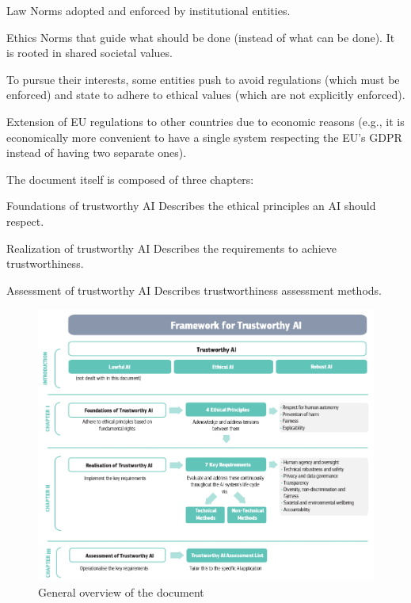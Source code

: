 \begin{remark}
    \phantom{}
    \begin{descriptionlist}
        \item[Law]  
            Norms adopted and enforced by institutional entities.
        
        \item[Ethics]  
            Norms that guide what should be done (instead of what can be done). It is rooted in shared societal values.
    \end{descriptionlist}

    \indenttbox
    \begin{example}
        To pursue their interests, some entities push to avoid regulations (which must be enforced) and state to adhere to ethical values (which are not explicitly enforced).
    \end{example}
    
    \indenttbox
    \begin{example}
        Extension of EU regulations to other countries due to economic reasons (e.g., it is economically more convenient to have a single system respecting the EU's GDPR instead of having two separate ones).
    \end{example}
\end{remark}

The document itself is composed of three chapters:
\begin{descriptionlist}
    \item[Foundations of trustworthy AI]
        Describes the ethical principles an AI should respect.

    \item[Realization of trustworthy AI] 
        Describes the requirements to achieve trustworthiness.

    \item[Assessment of trustworthy AI] 
        Describes trustworthiness assessment methods.
\end{descriptionlist}

\begin{figure}[h]
    \centering
    \includegraphics[width=0.9\linewidth]{./img/hleg_ethics_guidelines.png}
    \caption{General overview of the document}
\end{figure}



